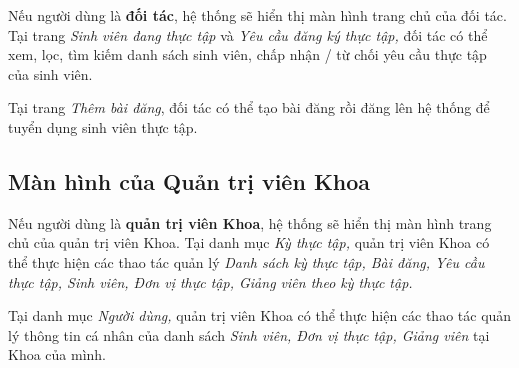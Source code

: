 \documentclass[./../main.tex]{subfiles}
\begin{document}
Nếu người dùng là \textbf{đối tác}, hệ thống sẽ hiển thị màn hình trang
chủ của đối tác. Tại trang \emph{Sinh viên đang thực tập} và \emph{Yêu
cầu đăng ký thực tập,} đối tác có thể xem, lọc, tìm kiếm danh sách sinh
viên, chấp nhận / từ chối yêu cầu thực tập của sinh viên.


Tại trang \emph{Thêm bài đăng}, đối tác có thể tạo bài đăng rồi đăng lên
hệ thống để tuyển dụng sinh viên thực tập.

\subsection{Màn hình của Quản trị viên Khoa}


Nếu người dùng là \textbf{quản trị viên Khoa}, hệ thống sẽ hiển thị màn
hình trang chủ của quản trị viên Khoa. Tại danh mục \emph{Kỳ thực tập,}
quản trị viên Khoa có thể thực hiện các thao tác quản lý \emph{Danh sách
kỳ thực tập, Bài đăng, Yêu cầu thực tập, Sinh viên, Đơn vị thực tập,
Giảng viên theo kỳ thực tập.}


Tại danh mục \emph{Người dùng,} quản trị viên Khoa có thể thực hiện các
thao tác quản lý thông tin cá nhân của danh sách \emph{Sinh viên, Đơn vị
thực tập, Giảng viên} tại Khoa của mình.
\end{document}
